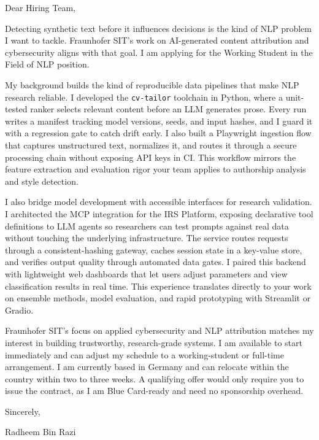 \documentclass[11pt,a4paper]{coverletter}
\begin{document}

\opening{Dear Hiring Team,}

Detecting synthetic text before it influences decisions is the kind of NLP problem I want to tackle. Fraunhofer SIT’s work on AI-generated content attribution and cybersecurity aligns with that goal. I am applying for the Working Student in the Field of NLP position.

My background builds the kind of reproducible data pipelines that make NLP research reliable. I developed the \texttt{cv-tailor} toolchain in Python, where a unit-tested ranker selects relevant content before an LLM generates prose. Every run writes a manifest tracking model versions, seeds, and input hashes, and I guard it with a regression gate to catch drift early. I also built a Playwright ingestion flow that captures unstructured text, normalizes it, and routes it through a secure processing chain without exposing API keys in CI. This workflow mirrors the feature extraction and evaluation rigor your team applies to authorship analysis and style detection.

I also bridge model development with accessible interfaces for research validation. I architected the MCP integration for the IRS Platform, exposing declarative tool definitions to LLM agents so researchers can test prompts against real data without touching the underlying infrastructure. The service routes requests through a consistent-hashing gateway, caches session state in a key-value store, and verifies output quality through automated data gates. I paired this backend with lightweight web dashboards that let users adjust parameters and view classification results in real time. This experience translates directly to your work on ensemble methods, model evaluation, and rapid prototyping with Streamlit or Gradio.

Fraunhofer SIT’s focus on applied cybersecurity and NLP attribution matches my interest in building trustworthy, research-grade systems. I am available to start immediately and can adjust my schedule to a working-student or full-time arrangement. I am currently based in Germany and can relocate within the country within two to three weeks. A qualifying offer would only require you to issue the contract, as I am Blue Card-ready and need no sponsorship overhead.

\closing{Sincerely,}{Radheem Bin Razi}

\clearpage
{}
\end{document}
